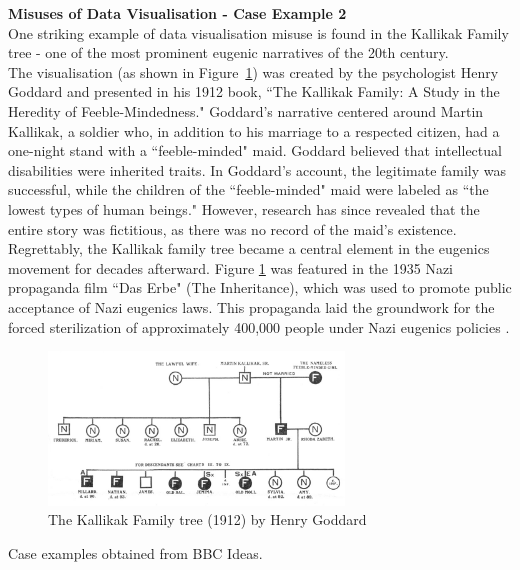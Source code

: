 \documentclass{article}\usepackage[]{graphicx}\usepackage[]{xcolor}
\begin{document}
\noindent 
\textbf{Misuses of Data Visualisation - Case Example 2}\\

\noindent
One striking example of data visualisation misuse is found in the Kallikak Family tree - one of the most prominent eugenic narratives of the 20th century.\\

\noindent
The visualisation (as shown in Figure~\ref{fig:familytree}) was created by the psychologist Henry Goddard and presented in his 1912 book, ``The Kallikak Family: A Study in the Heredity of Feeble-Mindedness." Goddard's narrative centered around Martin Kallikak, a soldier who, in addition to his marriage to a respected citizen, had a one-night stand with a ``feeble-minded" maid. Goddard believed that intellectual disabilities were inherited traits. In Goddard's account, the legitimate family was successful, while the children of the ``feeble-minded" maid were labeled as ``the lowest types of human beings." However, research has since revealed that the entire story was fictitious, as there was no record of the maid's existence\cite{fakedata}.\\

\noindent
Regrettably, the Kallikak family tree became a central element in the eugenics movement for decades afterward. Figure \ref{fig:familytree} was featured in the 1935 Nazi propaganda film ``Das Erbe" (The Inheritance), which was used to promote public acceptance of Nazi eugenics laws. This propaganda laid the groundwork for the forced sterilization of approximately 400,000 people under Nazi eugenics policies \cite{eugenics}.

\begin{figure}[H]
    \centering
    \includegraphics[width=0.7\textwidth]{image_reference/familytree.jpg}
    \caption{The Kallikak Family tree (1912) by Henry Goddard\cite{ktree}}
    \label{fig:familytree}
\end{figure}

\noindent
Case examples obtained from BBC Ideas\cite{bbcdatavis}.
\end{document}
